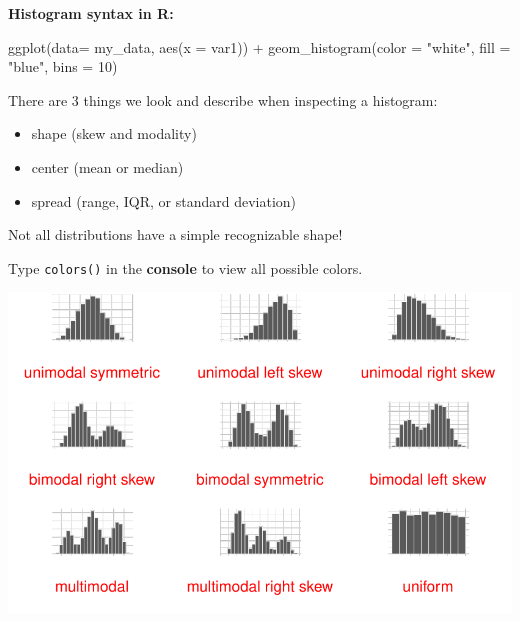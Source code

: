 \documentclass[
  letterpaper,
  DIV=11,
  numbers=noendperiod]{scrreprt}
\newenvironment{Shaded}{\begin{snugshade}}{\end{snugshade}}
\newcommand{\AttributeTok}[1]{\textcolor[rgb]{0.40,0.45,0.13}{#1}}
\newcommand{\DecValTok}[1]{\textcolor[rgb]{0.68,0.00,0.00}{#1}}
\newcommand{\FunctionTok}[1]{\textcolor[rgb]{0.28,0.35,0.67}{#1}}
\newcommand{\NormalTok}[1]{\textcolor[rgb]{0.00,0.23,0.31}{#1}}
\newcommand{\SpecialCharTok}[1]{\textcolor[rgb]{0.37,0.37,0.37}{#1}}
\newcommand{\StringTok}[1]{\textcolor[rgb]{0.13,0.47,0.30}{#1}}
\providecommand{\tightlist}{%
  \setlength{\itemsep}{0pt}\setlength{\parskip}{0pt}}\usepackage{longtable,booktabs,array}
\begin{document}
\begin{tcolorbox}[enhanced jigsaw, colframe=quarto-callout-note-color-frame, breakable, colback=white, toprule=.15mm, leftrule=.75mm, left=2mm, opacityback=0, rightrule=.15mm, arc=.35mm, bottomrule=.15mm]

\textbf{Histogram syntax in R:}

\begin{Shaded}
\begin{Highlighting}[]
\FunctionTok{ggplot}\NormalTok{(}\AttributeTok{data=}\NormalTok{ my\_data, }\FunctionTok{aes}\NormalTok{(}\AttributeTok{x =}\NormalTok{ var1)) }\SpecialCharTok{+}
  \FunctionTok{geom\_histogram}\NormalTok{(}\AttributeTok{color =} \StringTok{"white"}\NormalTok{, }\AttributeTok{fill =} \StringTok{"blue"}\NormalTok{, }\AttributeTok{bins =} \DecValTok{10}\NormalTok{)}
\end{Highlighting}
\end{Shaded}

There are 3 things we look and describe when inspecting a histogram:

\begin{itemize}
\tightlist
\item
  shape (skew and modality)
\item
  center (mean or median)
\item
  spread (range, IQR, or standard deviation)
\end{itemize}

Not all distributions have a simple recognizable shape!

Type \texttt{colors()} in the \textbf{console} to view all possible
colors.

\end{tcolorbox}

\begin{tcolorbox}[enhanced jigsaw, colframe=quarto-callout-note-color-frame, breakable, colback=white, toprule=.15mm, leftrule=.75mm, left=2mm, opacityback=0, rightrule=.15mm, arc=.35mm, bottomrule=.15mm]

\includegraphics{04-content_files/figure-pdf/unnamed-chunk-2-1.pdf}

\end{tcolorbox}
\end{document}
